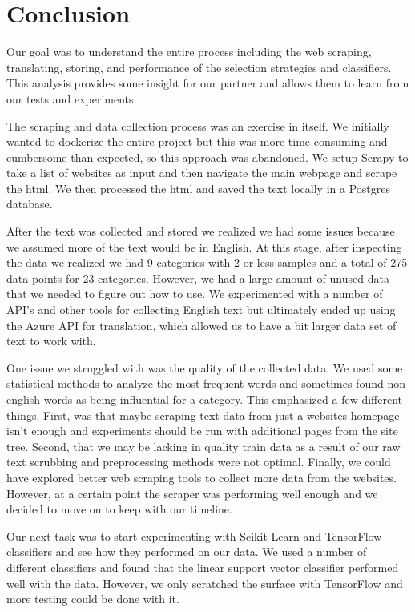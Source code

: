 \chapter*{Conclusion}

Our goal was to understand the entire process including the web scraping, translating, storing, and performance of the selection strategies and classifiers. This analysis provides some insight for our partner and allows them to learn from our tests and experiments. 

The scraping and data collection process was an exercise in itself. We initially wanted to dockerize the entire project but this was more time consuming and cumbersome than expected, so this approach was abandoned. We setup Scrapy to take a list of websites as input and then navigate the main webpage and scrape the html. We then processed the html and saved the text locally in a Postgres database. 

After the text was collected and stored we realized we had some issues because we assumed more of the text would be in English. At this stage, after inspecting the data we realized we had 9 categories with 2 or less samples and a total of 275 data points for 23 categories. However, we had a large amount of unused data that we needed to figure out how to use. We experimented with a number of API's and other tools for collecting English text but ultimately ended up using the Azure API for translation, which allowed us to have a bit larger data set of text to work with. 

One issue we struggled with was the quality of the collected data. We used some statistical methods to analyze the most frequent words and sometimes found non english words as being influential for a category. This emphasized a few different things. First, was that maybe scraping text data from just a websites homepage isn't enough and experiments should be run with additional pages from the site tree. Second, that we may be lacking in quality train data as a result of our raw text scrubbing and preprocessing methods were not optimal. Finally, we could have explored better web scraping tools to collect more data from the websites. However, at a certain point the scraper was performing well enough and we decided to move on to keep with our timeline.

Our next task was to start experimenting with Scikit-Learn and TensorFlow classifiers and see how they performed on our data. We used a number of different classifiers and found that the linear support vector classifier performed well with the data. However, we only scratched the surface with TensorFlow and more testing could be done with it. 

